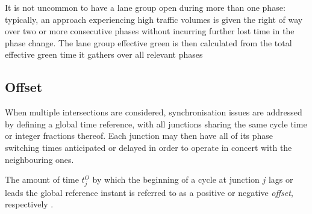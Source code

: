 It is not uncommon to have a lane group open during more than one phase: typically, an approach experiencing high traffic volumes is given the right of way over two or more consecutive phases without incurring further lost time in the phase change.
The lane group effective green is then calculated from the total effective green time it gathers over all relevant phases 

\subsection{Offset}
When multiple intersections are considered, synchronisation issues are addressed by defining a global time reference, with all junctions sharing the same cycle time or integer fractions thereof. Each junction may then have all of its phase switching times anticipated or delayed in order to operate in concert with the neighbouring ones.

The amount of time $t^{O}_{j}$ by which the beginning of a cycle at junction $j$ lags or leads the global reference instant is referred to as a positive or negative \emph{offset}, respectively .
